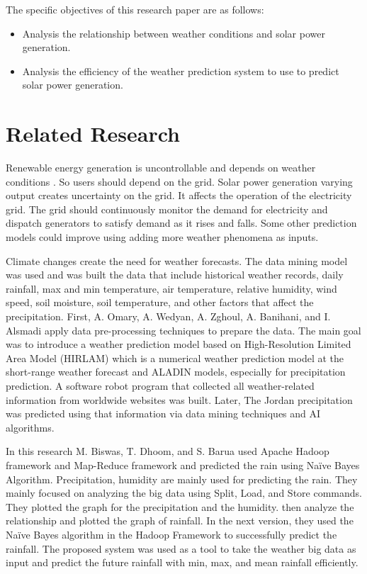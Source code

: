 \documentclass[conference]{IEEEtran}
\begin{document}
The specific objectives of this research paper are as follows:

\begin{itemize}

\item Analysis the relationship between weather conditions and solar power generation.

\item Analysis the efficiency of the weather prediction system to use to predict solar power generation.

\end{itemize}







\section{Related Research}

Renewable energy generation is uncontrollable and depends on weather conditions \cite{Hybrid}\cite{NavinSharma}\cite{Mohamed}\cite{Sam}. So users should depend on the grid. Solar power generation varying output creates uncertainty on the grid. It affects the operation of the electricity grid. The grid should continuously monitor the demand for electricity and dispatch generators to satisfy demand as it rises and falls. Some other prediction models could improve using adding more weather phenomena as inputs\cite{Sam}\cite{Hybrid}.

Climate changes create the need for weather forecasts. The data mining model was used and was built the data that include historical weather records, daily rainfall, max and min temperature, air temperature, relative humidity, wind speed, soil moisture, soil temperature, and other factors that affect the precipitation. First, A. Omary,  A. Wedyan,  A. Zghoul,  A. Banihani,  and  I. Alsmadi \cite{6220375} apply data pre-processing techniques to prepare the data. The main goal was to introduce a weather prediction model based on High-Resolution Limited Area Model (HIRLAM) which is a numerical weather prediction model at the short-range weather forecast and ALADIN models, especially for precipitation prediction. A software robot program that collected all weather-related information from worldwide websites was built. Later, The Jordan precipitation was predicted using that information via data mining techniques and AI algorithms.

In this research\cite{Munmun} M.  Biswas,  T.  Dhoom,  and  S.  Barua used Apache Hadoop framework and Map-Reduce framework and predicted the rain using Naïve Bayes Algorithm. Precipitation, humidity are mainly used for predicting the rain. They\cite{Munmun} mainly focused on analyzing the big data using Split, Load, and Store commands. They\cite{Munmun} plotted the graph for the precipitation and the humidity. then analyze the relationship and plotted the graph of rainfall. In the next version, they\cite{Munmun} used the Naïve Bayes algorithm in the Hadoop Framework to successfully predict the rainfall.  The proposed system was used as a tool to take the weather big data as input and predict the future rainfall with min, max, and mean rainfall efficiently.
\end{document}
